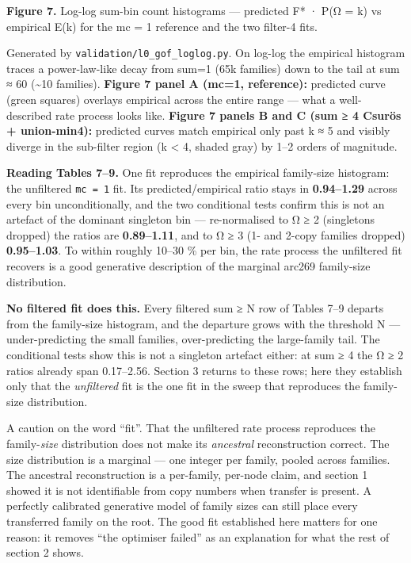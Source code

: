 \documentclass[
  10pt,
]{article}
\begin{document}
\textbf{Figure 7.} Log-log sum-bin count histograms --- predicted F* ·
P(Ω = k) vs empirical E(k) for the mc = 1 reference and the two filter-4
fits.

Generated by \texttt{validation/l0\_gof\_loglog.py}. On log-log the
empirical histogram traces a power-law-like decay from sum=1 (65k
families) down to the tail at sum ≈ 60 (\textasciitilde10 families).
\textbf{Figure 7 panel A (mc=1, reference):} predicted curve (green
squares) overlays empirical across the entire range --- what a
well-described rate process looks like. \textbf{Figure 7 panels B and C
(sum ≥ 4 Csurös + union-min4):} predicted curves match empirical only
past k ≈ 5 and visibly diverge in the sub-filter region (k \textless{}
4, shaded gray) by 1--2 orders of magnitude.

\textbf{Reading Tables 7--9.} One fit reproduces the empirical
family-size histogram: the unfiltered \texttt{mc\ =\ 1} fit. Its
predicted/empirical ratio stays in \textbf{0.94--1.29} across every bin
unconditionally, and the two conditional tests confirm this is not an
artefact of the dominant singleton bin --- re-normalised to Ω ≥ 2
(singletons dropped) the ratios are \textbf{0.89--1.11}, and to Ω ≥ 3
(1- and 2-copy families dropped) \textbf{0.95--1.03}. To within roughly
10--30 \% per bin, the rate process the unfiltered fit recovers is a
good generative description of the marginal arc269 family-size
distribution.

\textbf{No filtered fit does this.} Every filtered sum ≥ N row of Tables
7--9 departs from the family-size histogram, and the departure grows
with the threshold N --- under-predicting the small families,
over-predicting the large-family tail. The conditional tests show this
is not a singleton artefact either: at sum ≥ 4 the Ω ≥ 2 ratios already
span 0.17--2.56. Section 3 returns to these rows; here they establish
only that the \emph{unfiltered} fit is the one fit in the sweep that
reproduces the family-size distribution.

A caution on the word ``fit''. That the unfiltered rate process
reproduces the family-\emph{size} distribution does not make its
\emph{ancestral} reconstruction correct. The size distribution is a
marginal --- one integer per family, pooled across families. The
ancestral reconstruction is a per-family, per-node claim, and section 1
showed it is not identifiable from copy numbers when transfer is
present. A perfectly calibrated generative model of family sizes can
still place every transferred family on the root. The good fit
established here matters for one reason: it removes ``the optimiser
failed'' as an explanation for what the rest of section 2 shows.
\end{document}
